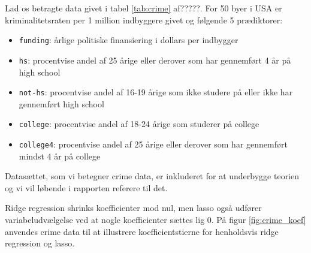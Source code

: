 \begin{exmp}
Lad os betragte data givet i tabel \ref{tab:crime} af?????.
For 50 byer i USA er kriminalitetsraten per 1 million indbyggere givet og følgende 5 prædiktorer: 
\begin{itemize}
\item \texttt{funding}: årlige politiske finansiering i dollars per indbygger
\item \texttt{hs}: procentvise andel af 25 årige eller derover som har gennemført 4 år på high school
\item \texttt{not-hs}: procentvise andel af 16-19 årige som ikke studere på eller ikke har gennemført high school
\item \texttt{college}: procentvise andel af 18-24 årige som studerer på college
\item \texttt{college4}: procentvise andel af 25 årige eller derover som har gennemført mindst 4 år på college
\end{itemize}
%

%
Datasættet, som vi betegner crime data, er inkluderet for at underbygge teorien og vi vil løbende i rapporten referere til det.
\end{exmp}
Ridge regression shrinks koefficienter mod nul, men lasso også udfører variabeludvælgelse ved at nogle koefficienter sættes lig 0.
På figur \ref{fig:crime_koef} anvendes crime data til at illustrere koefficientstierne for henholdsvis ridge regression og lasso.
%
